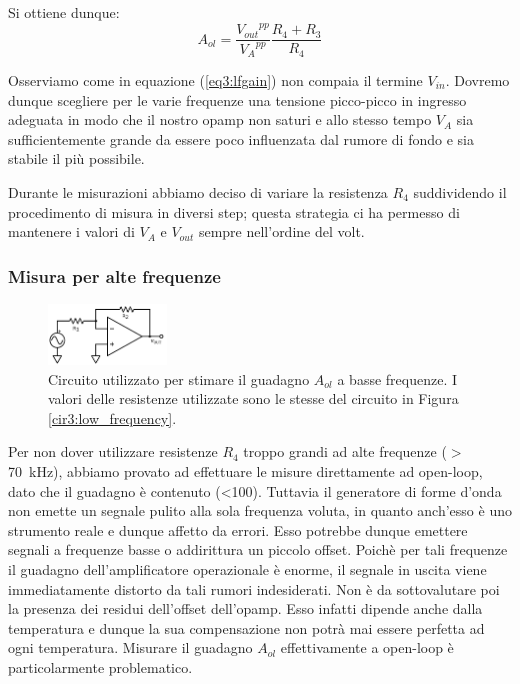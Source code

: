 Si ottiene dunque:
\begin{equation}
A_{ol}=\frac{{V_{out}}^{pp}}{{V_A}^{pp}} \frac{R_4+R_3}{R_4}
\label{eq3:lfgain}
\end{equation}

Osserviamo come in equazione (\ref{eq3:lfgain}) non compaia il termine $V_{in}$.
Dovremo dunque scegliere per le varie frequenze una tensione picco-picco in ingresso adeguata in modo che il nostro opamp non saturi e allo stesso tempo $V_A$ sia sufficientemente grande da essere poco influenzata dal rumore di fondo e sia stabile il più possibile.

Durante le misurazioni abbiamo deciso di variare la resistenza $R_4$ suddividendo il procedimento di misura in diversi step; questa strategia ci ha permesso di mantenere i valori di $V_A$ e $V_{out}$ sempre nell'ordine del volt. 

\subsubsection*{Misura per alte frequenze}

\begin{figure}
  \begin{center}
    \includegraphics[width=0.28\textwidth]{../E03/latex/HF_ol.pdf}
  \end{center}
  \caption{Circuito utilizzato per stimare il guadagno $A_{ol}$ a basse frequenze. I valori delle resistenze utilizzate sono le stesse del circuito in Figura \ref{cir3:low_frequency}.}
  \label{cir3:high_frequency}
\end{figure}

Per non dover utilizzare resistenze $R_4$ troppo grandi ad alte frequenze ($>$ \SI{70}{\kilo\hertz}), abbiamo provato ad effettuare le misure direttamente ad open-loop, dato che il guadagno è contenuto (\num{<100}).
Tuttavia il generatore di forme d'onda non emette un segnale pulito alla sola frequenza voluta, in quanto anch'esso è uno strumento reale e dunque affetto da errori.
Esso potrebbe dunque emettere segnali a frequenze basse o addirittura un piccolo offset.
Poichè per tali frequenze il guadagno dell'amplificatore operazionale è enorme, il segnale in uscita viene immediatamente distorto da tali rumori indesiderati.
Non è da sottovalutare poi la presenza dei residui dell'offset dell'opamp.
Esso infatti dipende anche dalla temperatura e dunque la sua compensazione non potrà mai essere perfetta ad ogni temperatura.
Misurare il guadagno $A_{ol}$ effettivamente a open-loop è particolarmente problematico.

